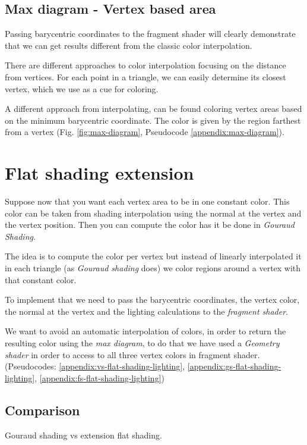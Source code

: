 \subsection{Max diagram - Vertex based area} \label{section:max-diagram}
Passing barycentric coordinates to the fragment shader will clearly demonstrate that we can get results different from the classic color interpolation.

There are different approaches to color interpolation focusing on the distance from vertices. For each point in a triangle, we can easily determine its closest vertex, which we use as a cue for coloring.

A different approach from interpolating, can be found coloring vertex areas based on the minimum barycentric coordinate.
The color is given by the region farthest from a vertex (Fig. \ref{fig:max-diagram}, Pseudocode \ref{appendix:max-diagram}).

\section{Flat shading extension} \label{section:extend-flat-shading-lighting}
Suppose now that you want each vertex area to be in one constant color. This color can be taken from shading interpolation using the normal at the vertex and the vertex position. Then you can compute the color has it be done in \textit{Gouraud Shading}.

The idea is to compute the color per vertex but instead of linearly interpolated it in each triangle (as \textit{Gouraud shading} does) we color regions around a vertex with that constant color.

To implement that we need to pass the barycentric coordinates, the vertex color, the normal at the vertex and the lighting calculations to the \textit{fragment shader}.

We want to avoid an automatic interpolation of colors, in order to return the resulting color using the \textit{max diagram}, to do that we have used a \textit{Geometry shader} in order to access to all three vertex colors in fragment shader. (Pseudocodes: \ref{appendix:vs-flat-shading-lighting}, \ref{appendix:gs-flat-shading-lighting}, \ref{appendix:fs-flat-shading-lighting})

\subsection{Comparison}
Gouraud shading vs extension flat shading.

